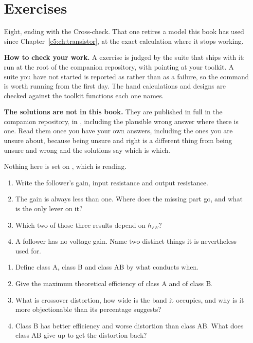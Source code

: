 
\section{Exercises}
\label{c8:sec:exercises}

Eight, ending with the Cross-check. That one retires a model this book has used since Chapter~\ref{c5:ch:transistor}, at the exact calculation where it stops working.

\begin{aside}
\textbf{How to check your work.} A  exercise is judged by the suite that ships with it: run  at the root of the companion repository, with  pointing at your toolkit. A suite you have not started is reported as  rather than as a failure, so the command is worth running from the first day. The hand calculations and designs are checked against the toolkit functions each one names.

\textbf{The solutions are not in this book.} They are published in full in the companion repository, in , including the plausible wrong answer where there is one. Read them once you have your own answers, including the ones you are unsure about, because being unsure and right is a different thing from being unsure and wrong and the solutions say which is which.
\end{aside}

Nothing here is set on , which is reading.

\label{c8:ex:1}
\begin{enumerate}
  \item Write the follower's gain, input resistance and output resistance.
  \item The gain is always less than one. Where does the missing part go, and what is the only lever on it?
  \item Which two of those three results depend on $h_{FE}$?
  \item A follower has no voltage gain. Name two distinct things it is nevertheless used for.
\end{enumerate}

\label{c8:ex:2}
\begin{enumerate}
  \item Define class A, class B and class AB by what conducts when.
  \item Give the maximum theoretical efficiency of class A and of class B.
  \item What is crossover distortion, how wide is the band it occupies, and why is it more objectionable than its percentage suggests?
  \item Class B has better efficiency and worse distortion than class AB. What does class AB give up to get the distortion back?
\end{enumerate}


